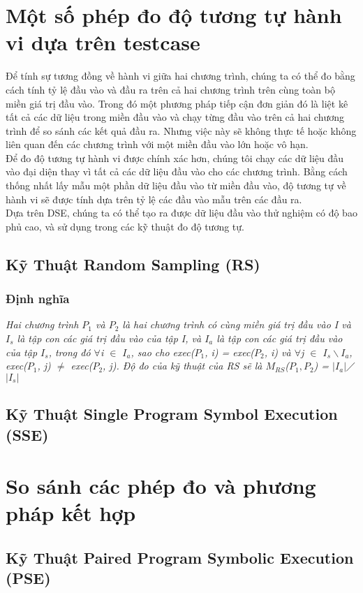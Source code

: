 \section{Một số phép đo độ tương tự hành vi dựa trên testcase}
Để tính sự tương đồng về hành vi giữa hai chương trình, chúng ta có thể đo bằng cách tính tỷ lệ đầu vào và đầu ra trên cả hai chương trình trên cùng toàn bộ miền giá trị đầu vào. Trong đó một phương pháp tiếp cận đơn giản đó là liệt kê tất cả các dữ liệu trong miền đầu vào và chạy từng đầu vào trên cả hai chương trình để so sánh các kết quả đầu ra. Nhưng việc này sẽ không thực tế hoặc không liên quan đến các chương trình với một miền đầu vào lớn hoặc vô hạn. \\
	
Để đo độ tương tự hành vi được chính xác hơn, chúng tôi chạy các dữ liệu đầu vào đại diện thay vì tất cả các dữ liệu đầu vào cho các chương trình. Bằng cách thống nhất lấy mẫu một phần dữ liệu đầu vào từ miền đầu vào, độ tương tự về hành vi sẽ được tính dựa trên tỷ lệ các đầu vào mẫu trên các đầu ra. \\
	
Dựa trên DSE, chúng ta có thể tạo ra được dữ liệu đầu vào thử nghiệm có độ bao phủ cao, và sử dụng trong các kỹ thuật đo độ tương tự. \\

\subsection{Kỹ Thuật Random Sampling (RS)}
	\subsubsection{Định nghĩa}
	\textit{Hai chương trình $P_{1}$ và $P_{2}$ là hai chương trình có cùng miền giá trị đầu vào I và $I_{s}$ là tập con các giá trị đầu vào của tập I, và  $I_{a}$ là tập con các giá trị đầu vào của tập $I_{s}$, trong đó $\forall$i $\in$ $I_{a}$, sao cho exec($P_{1}$, i) = exec($P_{2}$, i) và $\forall$j $\in$ $I_{s} \backslash I_{a}$, exec($P_{1}$, j) $\neq$ exec($P_{2}$, j). Độ đo của kỹ thuật của RS sẽ là $M_{RS}$($P_{1},P_{2}$) = $\left|I_{a}\right|$$\diagup$$\left|I_{s}\right|$}
	
	
\subsection{Kỹ Thuật Single Program Symbol Execution (SSE)}


\section{So sánh các phép đo và phương pháp kết hợp}
\subsection{Kỹ Thuật Paired Program Symbolic Execution (PSE)}
	


